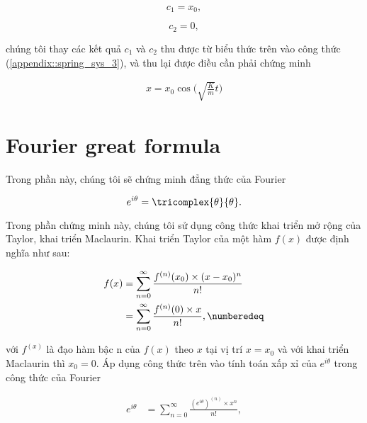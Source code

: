 		\begin{equation}
			c_1 = x_0,
		\end{equation}
	
		\begin{equation}
			c_2 = 0,
		\end{equation}
	
	\noindent chúng tôi thay các kết quả $c_1$ và $c_2$ thu được từ biểu thức trên vào công thức (\ref{appendix::spring_sys_3}), và thu lại được điều cần phải chứng minh
	
		\begin{equation}
			\begin{aligned}
				x = x_0 \cos\bigg(\sqrt{\frac{K}{m}}t\bigg)
			\end{aligned}
		\label{appendix::spring_sys_final}
		\end{equation}

\chapter{Fourier great formula}
\label{proof::euler_formula}

	Trong phần này, chúng tôi sẽ chứng minh đẳng thức của Fourier
	
		\begin{equation}
			e^{i\theta} = \tricomplex{\theta}{\theta}.
		\end{equation}
	
	Trong phần chứng minh này, chúng tôi sử dụng công thức khai triển mở rộng của Taylor, khai triển Maclaurin. Khai triển Taylor của một hàm $f(x)$ được định nghĩa như sau:
	
		\begin{align*}
			f(x)	& = \sum_{n = 0}^{\infty}{\frac{f^{(n)}(x_0) \times (x - x_0)^n}{n!}}\\
			& = \sum_{n = 0}^{\infty}{\frac{f^{(n)}(0) \times x}{n!}}, \numberedeq
			\label{appendix::fourier_1}
		\end{align*}
	
	\noindent với $f^{(x)}$ là đạo hàm bậc n của $f(x)$ theo $x$ tại vị trí $x = x_0$ và với khai triển Maclaurin thì $x_0 = 0$. Áp dụng công thức trên vào tính toán xấp xỉ của $e^{i\theta}$ trong công thức của Fourier
	
		\begin{equation}
			\begin{aligned}
				e^{i\theta}	& = \sum_{n = 0}^{\infty}{\frac{(e^{i\theta})^{(n)} \times x^n}{n!}},
			\end{aligned}
		\label{appendix::fourier_2}
		\end{equation}

